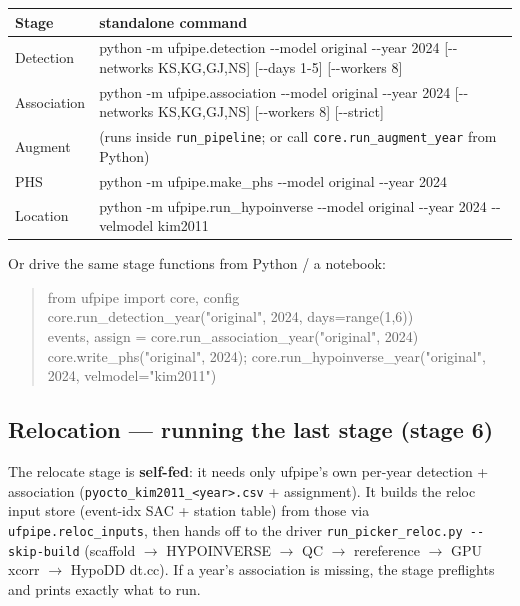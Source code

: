\documentclass[11pt]{article}
\newcommand{\code}[1]{\texttt{#1}}
\begin{document}
\begin{center}
\small
\begin{tabular}{@{}>{\raggedright\arraybackslash}p{2.4cm}>{\ttfamily\raggedright\arraybackslash}p{12.0cm}@{}}
\toprule
Stage & \normalfont standalone command \\
\midrule
Detection & python -m ufpipe.detection -{}-model original -{}-year 2024 [-{}-networks KS,KG,GJ,NS] [-{}-days 1-5] [-{}-workers 8] \\
Association & python -m ufpipe.association -{}-model original -{}-year 2024 [-{}-networks KS,KG,GJ,NS] [-{}-workers 8] [-{}-strict] \\
Augment & \normalfont(runs inside \code{run\_pipeline}; or call \code{core.run\_augment\_year} from Python) \\
PHS & python -m ufpipe.make\_phs -{}-model original -{}-year 2024 \\
Location & python -m ufpipe.run\_hypoinverse -{}-model original -{}-year 2024 -{}-velmodel kim2011 \\
\bottomrule
\end{tabular}
\end{center}

Or drive the same stage functions from Python / a notebook:
\begin{quote}\small\ttfamily
from ufpipe import core, config\\
core.run\_detection\_year("original", 2024, days=range(1,6))\\
events, assign = core.run\_association\_year("original", 2024)\\
core.write\_phs("original", 2024); core.run\_hypoinverse\_year("original", 2024, velmodel="kim2011")
\end{quote}

\subsection{Relocation — running the last stage (stage 6)}
The relocate stage is \textbf{self-fed}: it needs only ufpipe's own per-year detection + association
(\code{pyocto\_kim2011\_<year>.csv} + assignment). It builds the reloc input store (event-idx SAC + station table)
from those via \code{ufpipe.reloc\_inputs}, then hands off to the driver \code{run\_picker\_reloc.py -{}-skip-build}
(scaffold $\rightarrow$ HYPOINVERSE $\rightarrow$ QC $\rightarrow$ rereference $\rightarrow$ GPU xcorr $\rightarrow$
HypoDD dt.cc). If a year's association is missing, the stage preflights and prints exactly what to run.
\end{document}
